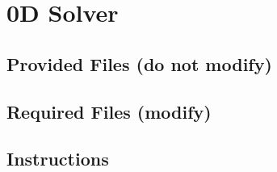 \documentclass{UQDoc}
\begin{document}
\section{0D Solver} \label{CMF:sec:0D}
\subsection{Provided Files (do not modify)}

\subsection{Required Files (modify)}

\subsection{Instructions}


% 
% 
\end{document}
